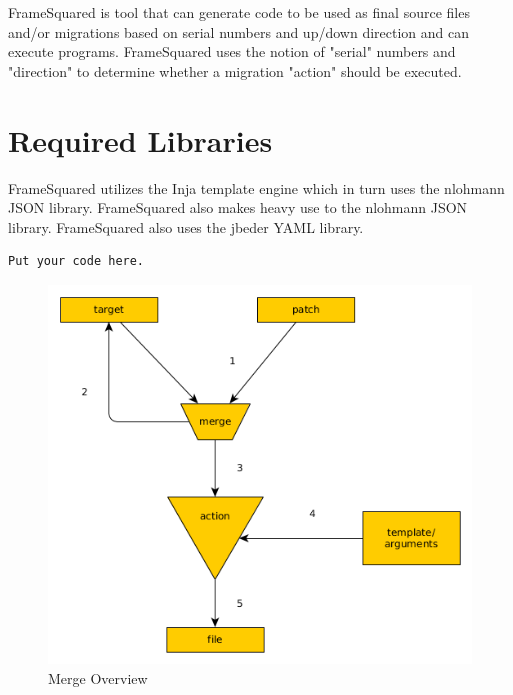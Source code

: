 \documentclass[]{article}
\begin{document}
FrameSquared is tool that can generate code to be used as final source files and/or migrations based on serial numbers and up/down direction and can execute programs. FrameSquared uses the notion of "serial" numbers and "direction" to determine whether a migration "action" should be executed.


\section{Required Libraries}
FrameSquared utilizes the Inja\cite{inja} template engine which in turn uses the nlohmann JSON library\cite{nlohmann}. FrameSquared also makes heavy use to the nlohmann JSON library. FrameSquared also uses the jbeder YAML\cite{jbeder} library.



\begin{lstlisting}
Put your code here.
\end{lstlisting}



\begin{figure}[H]
	\centering
	\includegraphics[scale=0.45]{fs2_merge.png}
	\caption{Merge Overview}
\end{figure}
\end{document}
